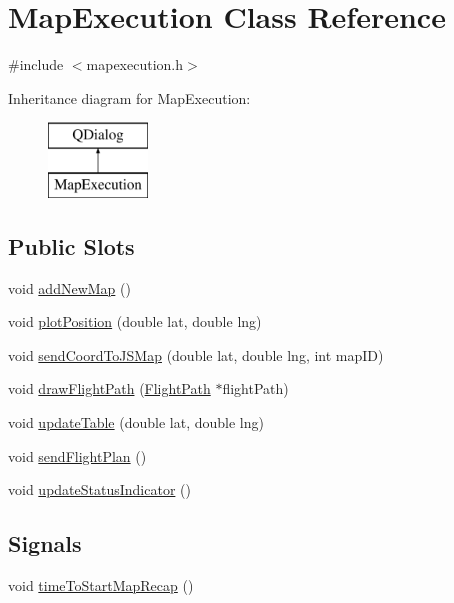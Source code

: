 \hypertarget{class_map_execution}{}\section{Map\+Execution Class Reference}
\label{class_map_execution}


{\ttfamily \#include $<$mapexecution.\+h$>$}

Inheritance diagram for Map\+Execution\+:\begin{figure}[H]
\begin{center}
\leavevmode
\includegraphics[height=2.000000cm]{class_map_execution}
\end{center}
\end{figure}
\subsection*{Public Slots}
\begin{DoxyCompactItemize}
\item 
void \hyperlink{class_map_execution_a0fc2a824601c5f09fb8d448f025d4da3}{add\+New\+Map} ()
\item 
void \hyperlink{class_map_execution_a993abccda8744bb5ad9110b97027d650}{plot\+Position} (double lat, double lng)
\item 
void \hyperlink{class_map_execution_abf980f0adb250cd2ef5a99668a793f46}{send\+Coord\+To\+J\+S\+Map} (double lat, double lng, int map\+I\+D)
\item 
void \hyperlink{class_map_execution_aae070b94d4318c09aaa4a95b244050c4}{draw\+Flight\+Path} (\hyperlink{class_flight_path}{Flight\+Path} $\ast$flight\+Path)
\item 
void \hyperlink{class_map_execution_a3bb03858cf15e2f9543a0e169383e13b}{update\+Table} (double lat, double lng)
\item 
void \hyperlink{class_map_execution_a5f0c7ab18a5fcc4c474eeb5b9707dc61}{send\+Flight\+Plan} ()
\item 
void \hyperlink{class_map_execution_af846e29b7a32021359fcf66bca46e20b}{update\+Status\+Indicator} ()
\end{DoxyCompactItemize}
\subsection*{Signals}
\begin{DoxyCompactItemize}
\item 
void \hyperlink{class_map_execution_a658805b61b3331c43c48211e543cafe0}{time\+To\+Start\+Map\+Recap} ()
\end{DoxyCompactItemize}
